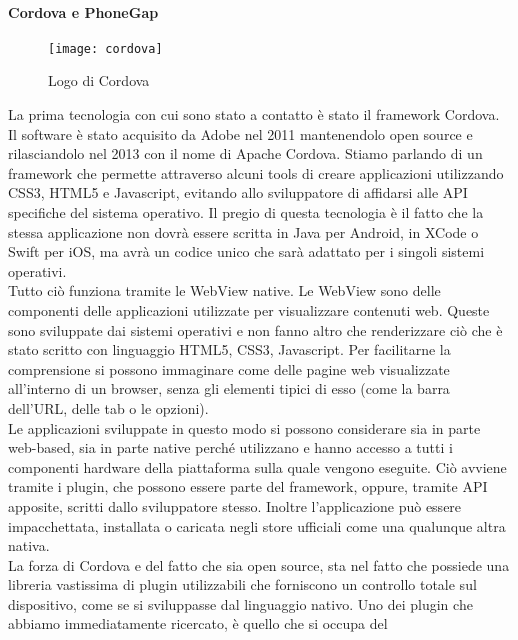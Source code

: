 \paragraph{Cordova e PhoneGap}

\begin{figure}[h]
	\begin{center}
		\texttt{[image: cordova]}
		\caption{Logo di Cordova}
	\end{center}
\end{figure}

La prima tecnologia con cui sono stato a contatto è stato il framework Cordova. Il software è stato acquisito da Adobe nel 2011 mantenendolo \gls{open source} e
rilasciandolo nel 2013 con il nome di Apache Cordova. Stiamo parlando di un framework che permette attraverso alcuni tools di creare applicazioni utilizzando CSS3, HTML5 e
Javascript, evitando allo sviluppatore di affidarsi alle API specifiche del sistema operativo. Il pregio di questa tecnologia è il fatto che la stessa
applicazione non dovrà essere scritta in Java per Android, in XCode o Swift per iOS, ma avrà un codice unico che sarà adattato per i singoli sistemi operativi. \\
Tutto ciò funziona tramite le WebView native. Le WebView sono delle componenti delle applicazioni utilizzate per visualizzare contenuti web. Queste sono
sviluppate dai sistemi operativi e non fanno altro che renderizzare ciò che è stato scritto con linguaggio HTML5, CSS3, Javascript. Per facilitarne la
comprensione si possono immaginare come delle pagine web visualizzate all'interno di un browser, senza gli elementi tipici di esso (come la barra dell'URL,
delle tab o le opzioni). \\
Le applicazioni sviluppate in questo modo si possono considerare sia in parte \gls{web-based}, sia in parte native perché utilizzano e hanno accesso a tutti i componenti
hardware della piattaforma sulla quale vengono eseguite. Ciò avviene tramite i plugin, che possono essere parte del framework, oppure, tramite API apposite,
scritti dallo sviluppatore stesso. Inoltre l'applicazione può essere impacchettata, installata o caricata negli store ufficiali come una qualunque altra nativa.
\\
La forza di Cordova e del fatto che sia open source, sta nel fatto che possiede una libreria vastissima di plugin utilizzabili che forniscono un controllo
totale sul dispositivo, come se si sviluppasse dal linguaggio nativo. Uno dei plugin che abbiamo immediatamente ricercato, è quello che si occupa del
